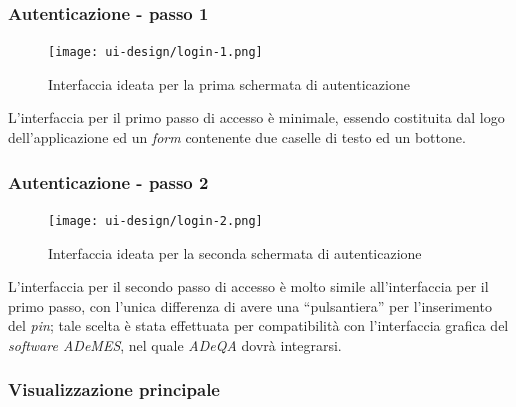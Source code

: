 \subsubsection*{Autenticazione - passo 1}

\begin{figure}[H]
    \centering
    \texttt{[image: ui-design/login-1.png]}
    \caption{Interfaccia ideata per la prima schermata di autenticazione}
\end{figure}
L’interfaccia per il primo passo di accesso è minimale, essendo costituita dal logo dell’applicazione ed un \textit{form} contenente due caselle di testo ed un bottone.

\subsubsection*{Autenticazione - passo 2}

\begin{figure}[H]
    \centering
    \texttt{[image: ui-design/login-2.png]}
    \caption{Interfaccia ideata per la seconda schermata di autenticazione}
\end{figure}
L’interfaccia per il secondo passo di accesso è molto simile all’interfaccia per il primo passo, con l’unica differenza di avere una “pulsantiera” per l’inserimento del \textit{pin}; tale scelta è stata effettuata per compatibilità con l’interfaccia grafica del \textit{software ADeMES}, nel quale \textit{ADeQA} dovrà integrarsi.

\subsubsection*{Visualizzazione principale}

